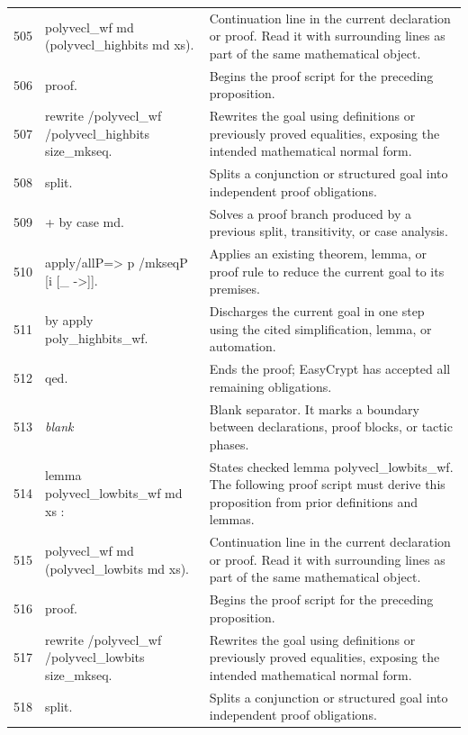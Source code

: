 \documentclass[10pt]{article}
\begin{document}
\begin{longtable}{r L{0.53\textwidth} L{0.37\textwidth}}
505 & {\ttfamily\scriptsize   polyvecl\_wf md (polyvecl\_highbits md xs).} & Continuation line in the current declaration or proof.  Read it with surrounding lines as part of the same mathematical object. \\
506 & {\ttfamily\scriptsize proof.} & Begins the proof script for the preceding proposition. \\
507 & {\ttfamily\scriptsize rewrite /polyvecl\_wf /polyvecl\_highbits size\_mkseq.} & Rewrites the goal using definitions or previously proved equalities, exposing the intended mathematical normal form. \\
508 & {\ttfamily\scriptsize split.} & Splits a conjunction or structured goal into independent proof obligations. \\
509 & {\ttfamily\scriptsize + by case md.} & Solves a proof branch produced by a previous split, transitivity, or case analysis. \\
510 & {\ttfamily\scriptsize apply/allP=> p /mkseqP [i [\_ ->]].} & Applies an existing theorem, lemma, or proof rule to reduce the current goal to its premises. \\
511 & {\ttfamily\scriptsize by apply poly\_highbits\_wf.} & Discharges the current goal in one step using the cited simplification, lemma, or automation. \\
512 & {\ttfamily\scriptsize qed.} & Ends the proof; EasyCrypt has accepted all remaining obligations. \\
513 & {\ttfamily\scriptsize \emph{blank}} & Blank separator.  It marks a boundary between declarations, proof blocks, or tactic phases. \\
514 & {\ttfamily\scriptsize lemma polyvecl\_lowbits\_wf md xs :} & States checked lemma polyvecl\_lowbits\_wf.  The following proof script must derive this proposition from prior definitions and lemmas. \\
515 & {\ttfamily\scriptsize   polyvecl\_wf md (polyvecl\_lowbits md xs).} & Continuation line in the current declaration or proof.  Read it with surrounding lines as part of the same mathematical object. \\
516 & {\ttfamily\scriptsize proof.} & Begins the proof script for the preceding proposition. \\
517 & {\ttfamily\scriptsize rewrite /polyvecl\_wf /polyvecl\_lowbits size\_mkseq.} & Rewrites the goal using definitions or previously proved equalities, exposing the intended mathematical normal form. \\
518 & {\ttfamily\scriptsize split.} & Splits a conjunction or structured goal into independent proof obligations. \\

\end{longtable}
\end{document}
